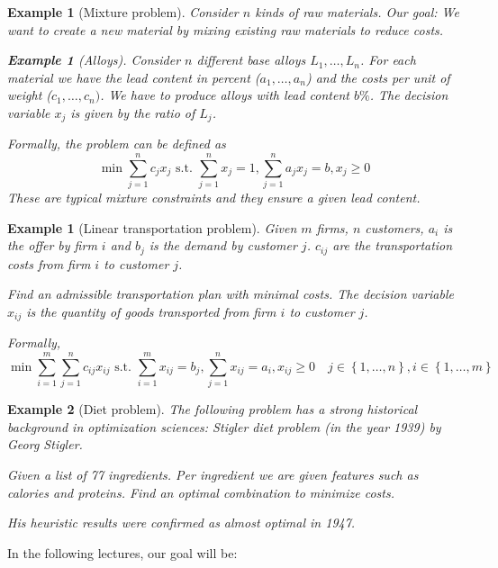\documentclass[a4paper]{article}
\numberwithin{lecref}{subsection}
\newcounter{exercises}
\newtheorem{example}[exercises]{Example}
\newtheorem*{Example}{Example}
\newcommand{\Set}[1]{\left\{#1\right\}}
\begin{document}
\begin{example}[Mixture problem]
	\label{example:2}
	Consider $n$ kinds of raw materials. Our goal: We want to create a new material by mixing existing raw materials to reduce costs.

	\begin{Example}[Alloys]
		Consider $n$ different base alloys $L_1, \dots, L_n$.
		For each material we have the lead content in percent ($a_1, \dots, a_n$) and the costs per unit of weight ($c_1, \dots, c_n)$.
		We have to produce alloys with lead content $b \%$.
		The decision variable $x_j$ is given by the ratio of $L_j$.

		Formally, the problem can be defined as
		\[ \min{\sum_{j=1}^n c_j x_j} \text{ s.t. } \sum_{j=1}^n x_j = 1, \sum_{j=1}^n a_j x_j = b, x_j \geq 0 \]
		These are typical mixture constraints and they ensure a given lead content.
	\end{Example}
\end{example}

\begin{example}[Linear transportation problem]
  \label{example:3}
  Given $m$ firms, $n$ customers, $a_i$ is the offer by firm $i$ and $b_j$ is the demand by customer $j$.
  $c_{ij}$ are the transportation costs from firm $i$ to customer $j$.

  Find an admissible transportation plan with minimal costs.
  The decision variable $x_{ij}$ is the quantity of goods transported from firm $i$ to customer $j$.

  Formally,
  \[ \min{\sum_{i=1}^m \sum_{j=1}^n c_{ij} x_{ij}} \text{ s.t. } \sum_{i=1}^m x_{ij} = b_j, \sum_{j=1}^n x_{ij} = a_i, x_{ij} \geq 0 \quad j \in \Set{1, \dots, n}, i \in \Set{1, \dots, m} \]
\end{example}

\begin{Example}[Diet problem]
  The following problem has a strong historical background in optimization sciences:
  Stigler diet problem (in the year 1939) by Georg Stigler. 

  Given a list of 77 ingredients. Per ingredient we are given features such as calories and proteins.
  Find an optimal combination to minimize costs.

  His heuristic results were confirmed as almost optimal in 1947.
\end{Example}

In the following lectures, our goal will be:
\end{document}
